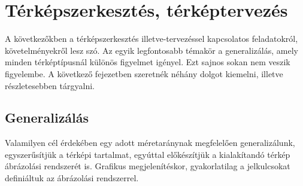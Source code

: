 \makeatletter
\def\thickhrulefill{\leavevmode \leaders \hrule height 1ex \hfill \kern \z@}
\def\@makechapterhead#1{%
  \vspace*{10\p@}%
  {\parindent \z@ \centering \reset@font
        {\Huge \scshape \thechapter}
        \par\nobreak
        \vspace*{15\p@}%
        \interlinepenalty\@M
        \begin{tabular}{@{\qquad}c@{\qquad}}
          \hline
          \\
          {\Huge \bfseries #1\par\nobreak} \\
          \\
          \hline
        \end{tabular}
    \vskip 100\p@
  }}
\def\@makeschapterhead#1{%
  \vspace*{10\p@}%
  {\parindent \z@ \centering \reset@font
        {\Huge \scshape \vphantom{\thechapter}}
        \par\nobreak
        \vspace*{15\p@}%
        \interlinepenalty\@M
        \begin{tabular}{@{\qquad}c@{\qquad}}
          \hline
          \\
          {\Huge \bfseries #1\par\nobreak} \\
          \\
          \hline
        \end{tabular}
    \vskip 100\p@
  }}

\chapter{Térképszerkesztés, térképtervezés}
\label{sec:térképészet}

	A következőkben a térképszerkesztés illetve-tervezéssel kapcsolatos feladatokról, követelményekről lesz szó. Az egyik
	legfontosabb témakör a generalizálás, amely minden térképtípusnál különös figyelmet igényel. Ezt sajnos sokan
	nem veszik figyelembe. A következő fejezetben szeretnék néhány dolgot
	kiemelni, illetve részletesebben tárgyalni.
		\section{Generalizálás}
		Valamilyen cél érdekében egy adott méretaránynak megfelelően generalizálunk, egyszerűsítjük a térképi tartalmat,
		egyúttal előkészítjük a kialakítandó
		térkép ábrázolási rendszerét is. Grafikus megjelenítéskor, gyakorlatilag a jelkulcsokat definiáltuk az ábrázolási rendszerrel.
		
